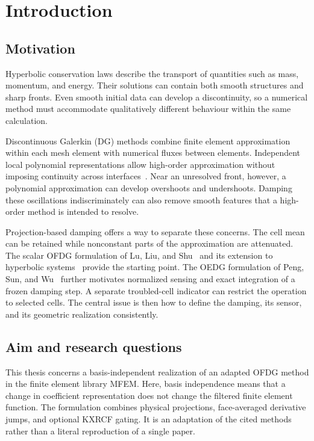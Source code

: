 \chapter{Introduction}
\label{chap:introduction}
\section{Motivation}
Hyperbolic conservation laws describe the transport of quantities such as mass,
momentum, and energy. Their solutions can contain both smooth structures and
sharp fronts. Even smooth initial data can develop a discontinuity, so a
numerical method must accommodate qualitatively different behaviour within the
same calculation.

Discontinuous Galerkin (DG) methods combine finite element approximation within
each mesh element with numerical fluxes between elements. Independent local
polynomial representations allow high-order approximation without imposing
continuity across interfaces~\cite{HesthavenWarburton2008}. Near an unresolved
front, however, a polynomial approximation can develop overshoots and
undershoots. Damping these oscillations indiscriminately can also remove
smooth features that a high-order method is intended to resolve.

Projection-based damping offers a way to separate these concerns. The cell
mean can be retained while nonconstant parts of the approximation are
attenuated. The scalar OFDG formulation of Lu, Liu, and Shu~\cite{LuEtAl2021}
and its extension to hyperbolic systems~\cite{LiuEtAl2022} provide the starting
point. The OEDG formulation of Peng, Sun, and Wu~\cite{PengEtAl2024} further
motivates normalized sensing and exact integration of a frozen damping step.
A separate troubled-cell indicator can restrict the operation to selected
cells. The central issue is then how to define the damping, its sensor, and
its geometric realization consistently.

\section{Aim and research questions}
This thesis concerns a basis-independent realization of an adapted OFDG method
in the finite element library MFEM. Here, basis independence means that a
change in coefficient representation does not change the filtered finite
element function. The formulation combines physical projections,
face-averaged derivative jumps, and optional KXRCF gating. It is an adaptation
of the cited methods rather than a literal reproduction of a single paper.

